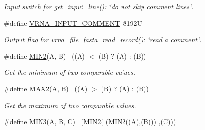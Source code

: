 \begin{DoxyCompactItemize}
\begin{DoxyCompactList}\small\item\em Input switch for \hyperlink{group__utils_ga8ef1835eb83f542396f59f0b205965e5}{get\+\_\+input\+\_\+line()}\+: {\itshape \char`\"{}do not skip comment lines\char`\"{}}. \end{DoxyCompactList}\item 
\#define \hyperlink{group__utils_gaf2062e0eeefffd3ed639af460b3d4fab}{V\+R\+N\+A\+\_\+\+I\+N\+P\+U\+T\+\_\+\+C\+O\+M\+M\+E\+NT}~8192U\hypertarget{group__utils_gaf2062e0eeefffd3ed639af460b3d4fab}{}\label{group__utils_gaf2062e0eeefffd3ed639af460b3d4fab}

\begin{DoxyCompactList}\small\item\em Output flag for \hyperlink{file__formats_8h_a8cfb7e271efc9e1f34640acb85475639}{vrna\+\_\+file\+\_\+fasta\+\_\+read\+\_\+record()}\+: {\itshape \char`\"{}read a comment\char`\"{}}. \end{DoxyCompactList}\item 
\#define \hyperlink{group__utils_ga2dd4a927a7f937f43a90c144d79107d8}{M\+I\+N2}(A,  B)        ~((A) $<$ (B) ? (A) \+: (B))\hypertarget{group__utils_ga2dd4a927a7f937f43a90c144d79107d8}{}\label{group__utils_ga2dd4a927a7f937f43a90c144d79107d8}

\begin{DoxyCompactList}\small\item\em Get the minimum of two comparable values. \end{DoxyCompactList}\item 
\#define \hyperlink{group__utils_gadd91367918fadbc8d585940d6206d6d2}{M\+A\+X2}(A,  B)        ~((A) $>$ (B) ? (A) \+: (B))\hypertarget{group__utils_gadd91367918fadbc8d585940d6206d6d2}{}\label{group__utils_gadd91367918fadbc8d585940d6206d6d2}

\begin{DoxyCompactList}\small\item\em Get the maximum of two comparable values. \end{DoxyCompactList}\item 
\#define \hyperlink{group__utils_gafb23911b91805692382004ab5441f47c}{M\+I\+N3}(A,  B,  C)  ~(\hyperlink{group__utils_ga2dd4a927a7f937f43a90c144d79107d8}{M\+I\+N2}(  (\hyperlink{group__utils_ga2dd4a927a7f937f43a90c144d79107d8}{M\+I\+N2}((A),(B))) ,(C)))\hypertarget{group__utils_gafb23911b91805692382004ab5441f47c}{}\label{group__utils_gafb23911b91805692382004ab5441f47c}


\end{DoxyCompactItemize}
